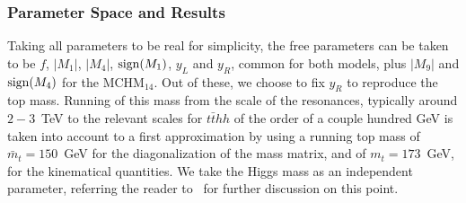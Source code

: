 \subsubsection{Parameter Space and Results}
\label{analysis}
Taking all parameters to be real for simplicity, the free parameters can be taken to be $f$, $|M_1|$, $|M_4|$, ${\rm sign}(M_1)$, $y_L$ and $y_R$, common for both models, plus $|M_9|$ and ${\rm sign}(M_4)$ for the MCHM$_{14}$.
Out of these, we choose to fix $y_R$ to reproduce the top mass. Running of this mass from the scale of the resonances, typically around $2-3$~TeV to the relevant scales for $t\bar{t}hh$ of the order of a
couple hundred GeV is taken into account to a first approximation by using a running top mass of $\bar{m}_t = 150$~GeV for the diagonalization of the mass
matrix, and of $m_t = 173$~GeV, for the kinematical quantities.   We take the Higgs mass as an independent parameter,
referring the reader to~\cite{MCHMtthh} for further discussion on this point.


